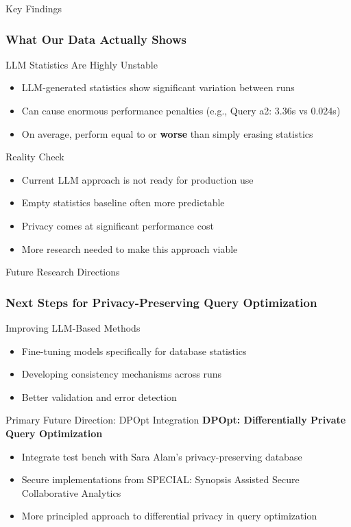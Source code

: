 \documentclass{beamer}
\begin{document}
\begin{frame}{Key Findings}
\frametitle{What Our Data Actually Shows}

\begin{alertblock}{\Large LLM Statistics Are Highly Unstable}
\Large
\begin{itemize}
    \item LLM-generated statistics show significant variation between runs
    \item Can cause enormous performance penalties (e.g., Query a2: 3.36s vs 0.024s)
    \item On average, perform equal to or \textbf{worse} than simply erasing statistics
\end{itemize}
\end{alertblock}

\vspace{0.5cm}

\begin{block}{Reality Check}
\begin{itemize}
    \item Current LLM approach is not ready for production use
    \item Empty statistics baseline often more predictable
    \item Privacy comes at significant performance cost
    \item More research needed to make this approach viable
\end{itemize}
\end{block}

\end{frame}

\begin{frame}{Future Research Directions}
\frametitle{Next Steps for Privacy-Preserving Query Optimization}

\begin{block}{Improving LLM-Based Methods}
\begin{itemize}
    \item Fine-tuning models specifically for database statistics
    \item Developing consistency mechanisms across runs
    \item Better validation and error detection
\end{itemize}
\end{block}

\vspace{0.5cm}

\begin{alertblock}{Primary Future Direction: DPOpt Integration}
\Large
\textbf{DPOpt: Differentially Private Query Optimization}
\begin{itemize}
    \item Integrate test bench with Sara Alam's privacy-preserving database
    \item Secure implementations from SPECIAL: Synopsis Assisted Secure Collaborative Analytics
    \item More principled approach to differential privacy in query optimization
\end{itemize}
\end{alertblock}

\end{frame}
\end{document}
